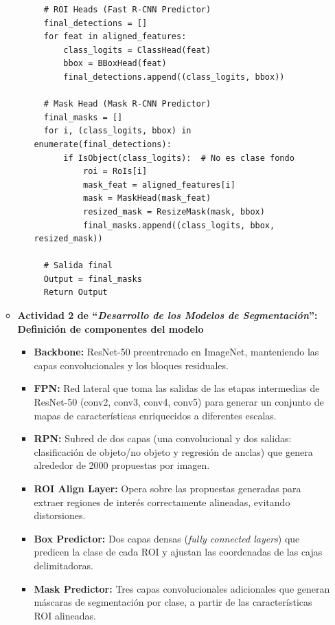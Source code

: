 \begin{enumerate}
\begin{itemize}
\begin{itemize}
\begin{verbatim}
  # ROI Heads (Fast R-CNN Predictor)
  final_detections = []
  for feat in aligned_features:
      class_logits = ClassHead(feat)
      bbox = BBoxHead(feat)
      final_detections.append((class_logits, bbox))
  
  # Mask Head (Mask R-CNN Predictor)
  final_masks = []
  for i, (class_logits, bbox) in enumerate(final_detections):
      if IsObject(class_logits):  # No es clase fondo
          roi = RoIs[i]
          mask_feat = aligned_features[i]
          mask = MaskHead(mask_feat)
          resized_mask = ResizeMask(mask, bbox)
          final_masks.append((class_logits, bbox, resized_mask))
  
  # Salida final
  Output = final_masks
  Return Output
  \end{verbatim}
  
\end{itemize}

\item\textbf{Actividad 2 de “\textit{Desarrollo de los Modelos de Segmentación}”: Definición de componentes del modelo}
  

\begin{itemize}
    \item \textbf{Backbone:} ResNet-50 preentrenado en ImageNet, manteniendo las capas convolucionales y los bloques residuales. 
    
    \item \textbf{FPN:} Red lateral que toma las salidas de las etapas intermedias de ResNet-50 (conv2, conv3, conv4, conv5) para generar un conjunto de mapas de características enriquecidos a diferentes escalas.
    
    \item \textbf{RPN:} Subred de dos capas (una convolucional y dos salidas: clasificación de objeto/no objeto y regresión de anclas) que genera alrededor de 2000 propuestas por imagen.
    
    \item \textbf{ROI Align Layer:} Opera sobre las propuestas generadas para extraer regiones de interés correctamente alineadas, evitando distorsiones.
    
    \item \textbf{Box Predictor:} Dos capas densas (\textit{fully connected layers}) que predicen la clase de cada ROI y ajustan las coordenadas de las cajas delimitadoras.
    
    \item \textbf{Mask Predictor:} Tres capas convolucionales adicionales que generan máscaras de segmentación por clase, a partir de las características ROI alineadas.
    

\end{itemize}
\end{itemize}
\end{enumerate}
